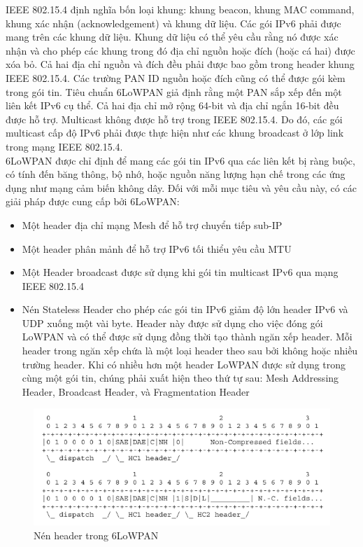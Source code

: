 \documentclass{report}
\begin{document}
IEEE 802.15.4 định nghĩa bốn loại khung: khung beacon, khung MAC command, khung xác
nhận (acknowledgement) và khung dữ liệu. Các gói IPv6 phải được mang trên các khung dữ
liệu. Khung dữ liệu có thể yêu cầu rằng nó được xác nhận và cho phép các khung trong đó địa
chỉ nguồn hoặc đích (hoặc cá hai) được xóa bỏ. Cả hai địa chỉ nguồn và đích đều phải được
bao gồm trong header khung IEEE 802.15.4. Các trường PAN ID nguồn hoặc đích cũng có thể
được gói kèm trong gói tin. Tiêu chuẩn 6LoWPAN giả định rằng một PAN sắp xếp đến một
liên kết IPv6 cụ thể. Cả hai địa chỉ mở rộng 64-bit và địa chỉ ngắn 16-bit đều được hỗ trợ.
Multicast không được hỗ trợ trong IEEE 802.15.4. Do đó, các gói multicast cấp độ IPv6 phải
được thực hiện như các khung broadcast ở lớp link trong mạng IEEE 802.15.4. \\

6LoWPAN được chỉ định để mang các gói tin IPv6 qua các liên kết bị ràng buộc, có tính đến
băng thông, bộ nhớ, hoặc nguồn năng lượng hạn chế trong các ứng dụng như mạng cảm biến
không dây. Đối với mỗi mục tiêu và yêu cầu này, có các giải pháp được cung cấp bởi 6LoWPAN:
\begin{itemize}
	\item Một header địa chỉ mạng Mesh để hỗ trợ chuyển tiếp sub-IP
	\item Một header phân mảnh để hỗ trợ IPv6 tối thiểu yêu cầu MTU
	\item Một Header broadcast được sử dụng khi gói tin multicast IPv6 qua mạng IEEE 802.15.4
	\item Nén Stateless Header cho phép các gói tin IPv6 giảm độ lớn header IPv6 và UDP xuống
	một vài byte. Header này được sử dụng cho việc đóng gói LoWPAN và có thể được sử dụng
	đồng thời tạo thành ngăn xếp header. Mỗi header trong ngăn xếp chứa là một loại header
	theo sau bởi không hoặc nhiều trường header. Khi có nhiều hơn một header LoWPAN được sử
	dụng trong cùng một gói tin, chúng phải xuất hiện theo thứ tự sau: Mesh Addressing Header,
	Broadcast Header, và Fragmentation Header
\end{itemize}
\newpage
\begin{figure}[h]
	\centering
	\includegraphics[scale = 0.7]{fig27.png}
	\caption{Nén header trong 6LoWPAN}
	\label{fig:Graph27}
\end{figure}
\end{document}
